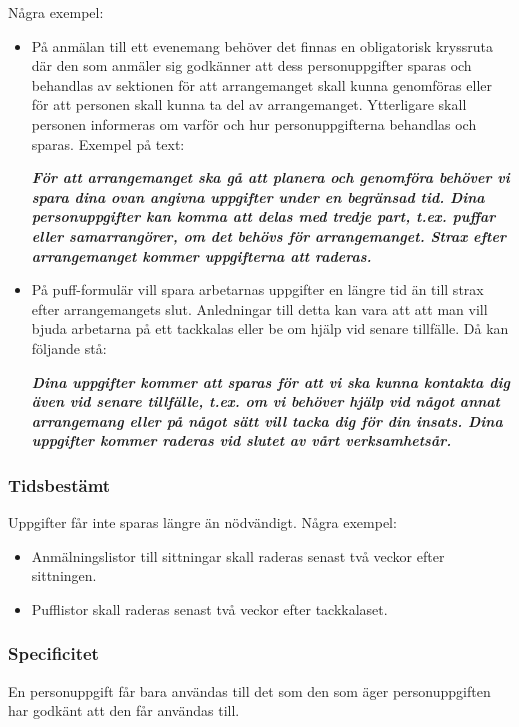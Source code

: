 Några exempel:
\begin{itemize}
    \item På anmälan till ett evenemang behöver det finnas en obligatorisk kryssruta där den
som anmäler sig godkänner att dess personuppgifter sparas och behandlas av sektionen för att arrangemanget skall kunna genomföras eller för att personen skall kunna
ta del av arrangemanget. Ytterligare skall personen informeras om varför och hur
personuppgifterna behandlas och sparas. Exempel på text:

\textit{\textbf{För att arrangemanget ska gå att planera och genomföra behöver vi spara dina ovan
angivna uppgifter under en begränsad tid. Dina personuppgifter kan komma att delas med
tredje part, t.ex. puffar eller samarrangörer, om det behövs för arrangemanget. Strax efter
arrangemanget kommer uppgifterna att raderas.
}}


    \item På puff-formulär vill spara arbetarnas uppgifter en längre tid än till strax efter arrangemangets slut. Anledningar till detta kan vara att att man vill bjuda arbetarna på ett tackkalas eller be om hjälp vid senare tillfälle. Då kan följande stå:
    
\textit{\textbf{Dina uppgifter kommer att sparas för att vi ska kunna kontakta dig även vid senare tillfälle, t.ex. om vi behöver hjälp vid något annat arrangemang eller på något sätt vill tacka dig för din insats. Dina uppgifter kommer raderas vid slutet av vårt verksamhetsår.}}
        
\end{itemize}

\subsubsection{Tidsbestämt}
Uppgifter får inte sparas längre än nödvändigt. Några exempel:
\begin{itemize}
    \item Anmälningslistor till sittningar skall raderas senast två veckor efter sittningen.
    \item Pufflistor skall raderas senast två veckor efter tackkalaset.
\end{itemize}

\subsubsection{Specificitet}
En personuppgift får bara användas till det som den som äger personuppgiften har godkänt
att den får användas till.

